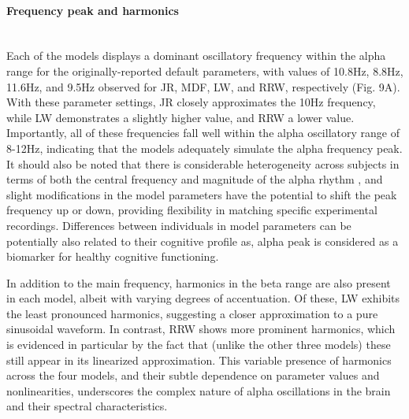 \documentclass[12pt,twoside]{article}
\begin{document}
\paragraph{Frequency peak and harmonics}~\\
Each of the models displays a dominant oscillatory frequency within the alpha range for the originally-reported default parameters, with values of 10.8Hz, 8.8Hz, 11.6Hz, and 9.5Hz observed for JR, MDF, LW, and RRW, respectively (Fig. 9A). With these parameter settings, JR closely approximates the 10Hz frequency, while LW demonstrates a slightly higher value, and RRW a lower value. Importantly, all of these frequencies fall well within the alpha oscillatory range of 8-12Hz, indicating that the models adequately simulate the alpha frequency peak. It should also be noted that there is considerable heterogeneity across subjects in terms of both the central frequency and magnitude of the alpha rhythm \citep{haegens2014inter}, and slight modifications in the model parameters have the potential to shift the peak frequency up or down, providing flexibility in matching specific experimental recordings. Differences between individuals in model parameters can be potentially also related to their cognitive profile as, alpha peak is considered as a biomarker for healthy cognitive functioning.

In addition to the main frequency, harmonics in the beta range are also present in each model, albeit with varying degrees of accentuation. Of these, LW exhibits the least pronounced harmonics, suggesting a closer approximation to a pure sinusoidal waveform. In contrast, RRW shows more prominent harmonics, which is evidenced in particular by the fact that (unlike the other three models) these still appear in its linearized approximation. This variable presence of harmonics across the four models, and their subtle dependence on parameter values and nonlinearities, underscores the complex nature of alpha oscillations in the brain and their spectral characteristics.
\end{document}
